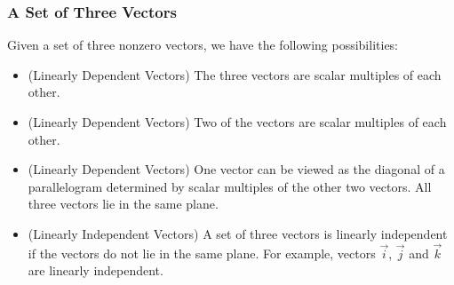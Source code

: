 \documentclass{ximera}
\begin{document}
\subsubsection*{A Set of Three Vectors}
Given a set of three nonzero vectors, we have the following possibilities: 
\begin{itemize}
\item (Linearly Dependent Vectors)
The three vectors are scalar multiples of each other.
\begin{center}
\end{center}
\item (Linearly Dependent Vectors) Two of the vectors are scalar multiples of each other.
\begin{center}
\end{center}
\item (Linearly Dependent Vectors) One vector can be viewed as the diagonal of a parallelogram determined by scalar multiples of the other two vectors.  All three vectors lie in the same plane.
\begin{center}
\end{center}
\item (Linearly Independent Vectors)
A set of three vectors is linearly independent if the vectors do not lie in the same plane.  For example, vectors $\vec{i}$, $\vec{j}$ and $\vec{k}$ are linearly independent.
\end{itemize}
\end{document}
